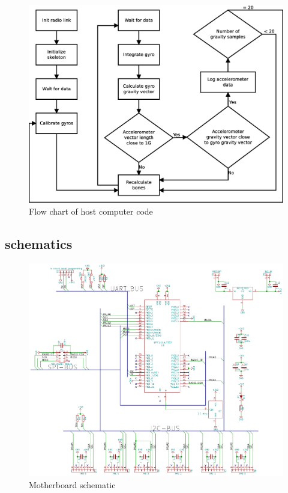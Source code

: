 \documentclass[a4paper, 12pt]{article}
\begin{document}
\begin{figure}[H]
    \centering
    \includegraphics[scale=0.4]{pi.eps}
    \caption{Flow chart of host computer code}
    \label{fig:pic4}
\end{figure}


\subsection*{schematics}

\begin{figure}[H]
    \centering
    \includegraphics[scale=0.65]{mb_schematic.pdf}
    \caption{Motherboard schematic}
    \label{fig:pic5}
\end{figure}
\end{document}

